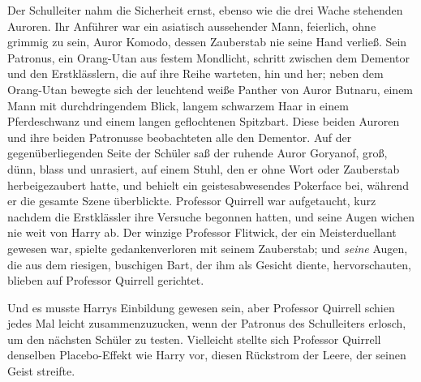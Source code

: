 Der Schulleiter nahm die Sicherheit ernst, ebenso wie die drei Wache stehenden Auroren. Ihr Anführer war ein asiatisch aussehender Mann, feierlich, ohne grimmig zu sein, Auror Komodo, dessen Zauberstab nie seine Hand verließ. Sein Patronus, ein Orang-Utan aus festem Mondlicht, schritt zwischen dem Dementor und den Erstklässlern, die auf ihre Reihe warteten, hin und her; neben dem Orang-Utan bewegte sich der leuchtend weiße Panther von Auror Butnaru, einem Mann mit durchdringendem Blick, langem schwarzem Haar in einem Pferdeschwanz und einem langen geflochtenen Spitzbart. Diese beiden Auroren und ihre beiden Patronusse beobachteten alle den Dementor. Auf der gegenüberliegenden Seite der Schüler saß der ruhende Auror Goryanof, groß, dünn, blass und unrasiert, auf einem Stuhl, den er ohne Wort oder Zauberstab herbeigezaubert hatte, und behielt ein geistesabwesendes Pokerface bei, während er die gesamte Szene überblickte. Professor Quirrell war aufgetaucht, kurz nachdem die Erstklässler ihre Versuche begonnen hatten, und seine Augen wichen nie weit von Harry ab. Der winzige Professor Flitwick, der ein Meisterduellant gewesen war, spielte gedankenverloren mit seinem Zauberstab; und \emph{seine} Augen, die aus dem riesigen, buschigen Bart, der ihm als Gesicht diente, hervorschauten, blieben auf Professor Quirrell gerichtet.

Und es musste Harrys Einbildung gewesen sein, aber Professor Quirrell schien jedes Mal leicht zusammenzuzucken, wenn der Patronus des Schulleiters erlosch, um den nächsten Schüler zu testen. Vielleicht stellte sich Professor Quirrell denselben Placebo-Effekt wie Harry vor, diesen Rückstrom der Leere, der seinen Geist streifte.

